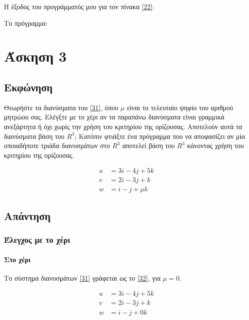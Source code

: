 \documentclass[12pt, fleqn, leqno]{extreport}
\begin{document}
Η έξοδος του προγράμματός μου για τον πίνακα \eqref{22}:


Το πρόγραμμα:



\chapter{Άσκηση 3}
\section{Εκφώνηση}

Θεωρήστε τα διανύσματα του \eqref{31}, όπου $\mu$ είναι το τελευταίο ψηφίο του αριθμού μητρώου σας. Ελέγξτε με το χέρι αν τα παραπάνω διανύσματα είναι γραμμικά ανεξάρτητα ή όχι χωρίς την χρήση του κριτηρίου της ορίζουσας. Αποτελούν αυτά τα διανύσματα βάση του $R^{3}$; Κατόπιν φτιάξτε ένα πρόγραμμα που να αποφασίζει αν μία οποιαδήποτε τριάδα διανυσμάτων στο $R^{3}$ αποτελεί βάση του $R^{3}$ κάνοντας χρήση του κριτηρίου της ορίζουσας.

\begin{equation}%
    \begin{aligned}
        u & = 3i - 4j + 5k  \\
        v & = 2i - 3j + k   \\
        w & = i - j + \mu k
    \end{aligned}\label{31}
\end{equation}

\newpage
\section{Απάντηση}

\subsection{Έλεγχος με το χέρι}
\subsubsection{Στο χέρι}

Το σύστημα διανυσμάτων \eqref{31} γράφεται ως το \eqref{32}, για $\mu = 0$.

\begin{equation}%
    \begin{aligned}
        u & = 3i - 4j + 5k \\
        v & = 2i - 3j + k  \\
        w & = i - j + 0k
    \end{aligned}\label{32}
\end{equation}
\end{document}
